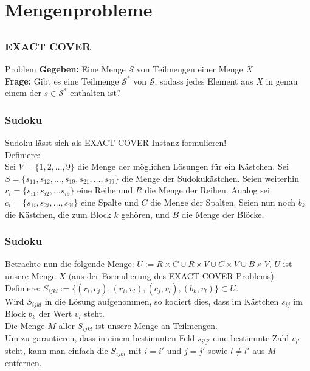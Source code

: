 \section{Mengenprobleme}
\subsection{}

\begin{frame}
\frametitle{EXACT COVER}
\begin{block}{Problem}
\textbf{Gegeben:} Eine Menge $\mathcal{S}$ von Teilmengen einer Menge $X$\\
\textbf{Frage:} Gibt es eine Teilmenge $\mathcal{S}^*$ von $\mathcal{S}$, sodass jedes Element aus $X$ in genau einem der $s \in \mathcal{S}^*$ enthalten ist?
\end{block}
\end{frame}

\begin{frame}
\frametitle{Sudoku}
Sudoku lässt sich als EXACT-COVER Instanz formulieren!\\
Definiere:\\
Sei $V = \{1,2,\ldots,9\}$ die Menge der möglichen Lösungen für ein Kästchen.
Sei $S = \{s_{11}, s_{12},\ldots,s_{19},s_{21},\ldots,s_{99}\}$ die Menge der Sudokukästchen.
Seien weiterhin $r_i = \{s_{i1}, s_{i2}, \ldots s_{i9}\}$ eine Reihe und $R$ die Menge der Reihen.
Analog sei $c_i = \{s_{1i}, s_{2i}, \ldots, s_{9i}\}$ eine Spalte und $C$ die Menge der Spalten.
Seien nun noch $b_k$ die Kästchen, die zum Block $k$ gehören, und $B$ die Menge der Blöcke.
\end{frame}

\begin{frame}
\frametitle{Sudoku}
Betrachte nun die folgende Menge: $U := R \times C \cup R \times V \cup C \times V \cup B \times V$, $U$ ist unsere Menge $X$ (aus der Formulierung des EXACT-COVER-Problems).\\
Definiere: $S_{ijkl} := \{(r_i,c_j),(r_i,v_l),(c_j,v_l),(b_k,v_l)\} \subset U$.\\[8pt]
Wird $S_{ijkl}$ in die Lösung aufgenommen, so kodiert dies, dass im Kästchen $s_{ij}$ im Block $b_k$ der Wert $v_l$ steht.\\
Die Menge $M$ aller $S_{ijkl}$ ist unsere Menge an Teilmengen.\\
Um zu garantieren, dass in einem bestimmten Feld $s_{i'j'}$ eine bestimmte Zahl $v_{l'}$ steht, kann man einfach die $S_{ijkl}$ mit $i = i'$ und $j = j'$ sowie $l \neq l'$ aus $M$ entfernen.
\end{frame}

